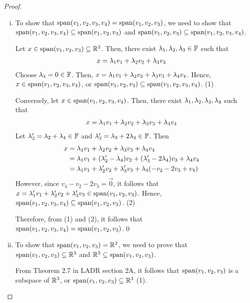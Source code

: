 \renewcommand{\qedsymbol}{$ $}
\begin{proof}
    \begin{enumerate}[(i)]
        \renewcommand{\qedsymbol}{$\blacksquare$}
        \item To show that $\textnormal{span}(v_1,v_2,v_3,v_4)=\textnormal{span}(v_1,v_2,v_3)$, we need to show that\\ $\textnormal{span}(v_1,v_2,v_3,v_4)\subseteq\textnormal{span}(v_1,v_2,v_3)$ and $\textnormal{span}(v_1,v_2,v_3)\subseteq\textnormal{span}(v_1,v_2,v_3,v_4)$.
        
        Let $x\in\textnormal{span}(v_1,v_2,v_3)\subseteq\mathbb R^3$. Then, there exist $\lambda_1,\lambda_2,\lambda_3\in\mathbb F$ such that
        \[
            \begin{aligned}
                x=\lambda_1v_1+\lambda_2v_2+\lambda_3v_3
            \end{aligned}    
        \]
        Choose $\lambda_4=0\in\mathbb F$. Then, $x=\lambda_1v_1+\lambda_2v_2+\lambda_3v_3+\lambda_4v_4$. Hence, $x\in\textnormal{span}(v_1,v_2,v_3,v_4)$, or $\textnormal{span}(v_1,v_2,v_3)\subseteq\textnormal{span}(v_1,v_2,v_3,v_4)$. (1)
        
        Conversely, let $x\in\textnormal{span}(v_1,v_2,v_3,v_4)$. Then, there exist $\lambda_1,\lambda_2,\lambda_3,\lambda_4$ such that
        \[
            \begin{aligned}
                x=\lambda_1v_1+\lambda_2v_2+\lambda_3v_3+\lambda_4v_4
            \end{aligned}
        \]  
        Let $\lambda_2'=\lambda_2+\lambda_4\in\mathbb F$ and $\lambda_3'=\lambda_3+2\lambda_4\in\mathbb F$. Then
        \[
            \begin{aligned}
                x &= \lambda_1v_1+\lambda_2v_2+\lambda_3v_3+\lambda_4v_4\\
                  &= \lambda_1v_1+(\lambda_2'-\lambda_4)v_2+(\lambda_3'-2\lambda_4)v_3+\lambda_4v_4\\
                  &= \lambda_1v_1+\lambda_2'v_2+\lambda_3'v_3+\lambda_4(-v_2-2v_3+v_4)
            \end{aligned}  
        \]
        However, since $v_4-v_2-2v_3=\vec{0}$, it follows that $x=\lambda_1'v_1+\lambda_2'v_2+\lambda_3'v_3\in\textnormal{span}(v_1,v_2,v_3)$. Hence, $\textnormal{span}(v_1,v_2,v_3,v_4)\subseteq\textnormal{span}(v_1,v_2,v_3)$. (2)

        Therefore, from (1) and (2), it follows that $\textnormal{span}(v_1,v_2,v_3,v_4)=\textnormal{span}(v_1,v_2,v_3)$.\qed
        \item To show that $\textnormal{span}(v_1,v_2,v_3)=\mathbb R^3$, we need to prove that $\textnormal{span}(v_1,v_2,v_3)\subseteq\mathbb R^3$ and $\mathbb R^3\subseteq\textnormal{span}(v_1,v_2,v_3)$.

        From Theorem 2.7 in LADR section 2A, it follows that $\textnormal{span}(v_1,v_2,v_3)$ is a subspace of $\mathbb R^3$, or $\textnormal{span}(v_1,v_2,v_3)\subseteq\mathbb R^3$ (1).


\end{enumerate}
\end{proof}
